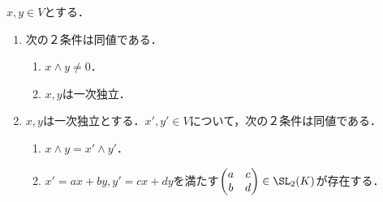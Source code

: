 \documentclass[uplatex,dvipdfmx]{jsreport}
\begin{document}
\begin{proposition}[???]
    $x,y\in V$とする．
    \begin{enumerate}
        \item 次の２条件は同値である．
        \begin{enumerate}[(1)]
            \item $x\wedge y\ne 0$．
            \item $x,y$は一次独立．
        \end{enumerate}
        \item $x,y$は一次独立とする．$x',y'\in V$について，次の２条件は同値である．
        \begin{enumerate}[(1)]
            \item $x\wedge y=x'\wedge y'$．
            \item $x'=ax+by,y'=cx+dy$を満たす$\begin{pmatrix}a&c\\b&d\end{pmatrix}\in\SL_2(K)$が存在する．
        \end{enumerate}
    \end{enumerate}
\end{proposition}
\end{document}
